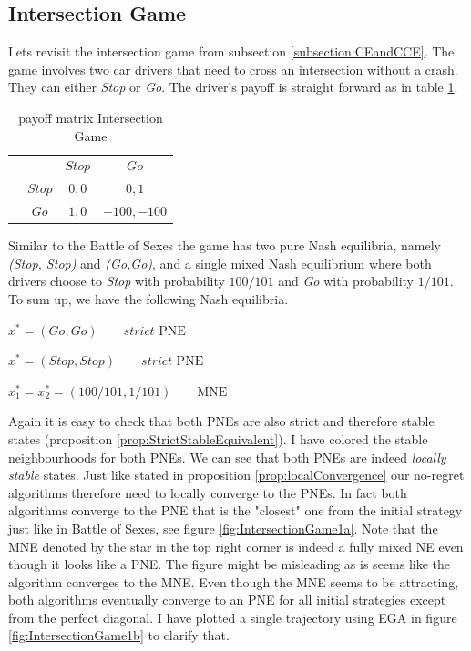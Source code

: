 \subsection{Intersection Game}\label{subsection:intersectionGame}

Lets revisit the intersection game from subsection \ref{subsection:CEandCCE}. The game involves two car drivers that need to cross an intersection without a crash. They can either \textit{Stop} or \textit{Go}. The driver's payoff is straight forward as in table \ref{tab:payoffIntersection}. 

\begin{table}[H]\centering
\setlength{\extrarowheight}{2pt}
\begin{tabular}{cc|c|c|}
  & \multicolumn{1}{c}{} & \multicolumn{1}{c}{$Stop$}  & \multicolumn{1}{c}{$Go$} \\\cline{3-4}
  & $Stop$ & $0,0$ & $0,1$ \\\cline{3-4}
  & $Go$ & $1,0$ & $-100,-100$ \\\cline{3-4}
\end{tabular}\caption{\label{tab:payoffIntersection}payoff matrix Intersection Game}
\end{table}

Similar to the Battle of Sexes the game has two pure Nash equilibria, namely \textit{(Stop, Stop)} and \textit{(Go,Go)}, and a single mixed Nash equilibrium where both drivers choose to \textit{Stop} with probability $100/101$ and \textit{Go} with probability $1/101$. To sum up, we have the following Nash equilibria.

\begin{description}\centering
    \item $x^{*} = (Go,Go) \qquad \textit{strict }\text{PNE}$
    \item $x^{*} = (Stop,Stop) \qquad \textit{strict }\text{PNE}$
    \item $x_{1}^* = x_{2}^* = (100/101,1/101) \qquad \text{MNE}$
\end{description}

Again it is easy to check that both PNEs are also strict and therefore stable states (proposition \ref{prop:StrictStableEquivalent}). I have colored the stable neighbourhoods for both PNEs. We can see that both PNEs are indeed \textit{locally stable} states. Just like stated in proposition \ref{prop:localConvergence} our no-regret algorithms therefore need to locally converge to the PNEs. In fact both algorithms converge to the PNE that is the "closest" one from the initial strategy just like in Battle of Sexes, see figure \ref{fig:IntersectionGame1a}. Note that the MNE denoted by the star in the top right corner is indeed a fully mixed NE even though it looks like a PNE. The figure might be misleading as is seems like the algorithm converges to the MNE. Even though the MNE seems to be attracting, both algorithms eventually converge to an PNE for all initial strategies except from the perfect diagonal. I have plotted a single trajectory using EGA in figure \ref{fig:IntersectionGame1b} to clarify that. 

